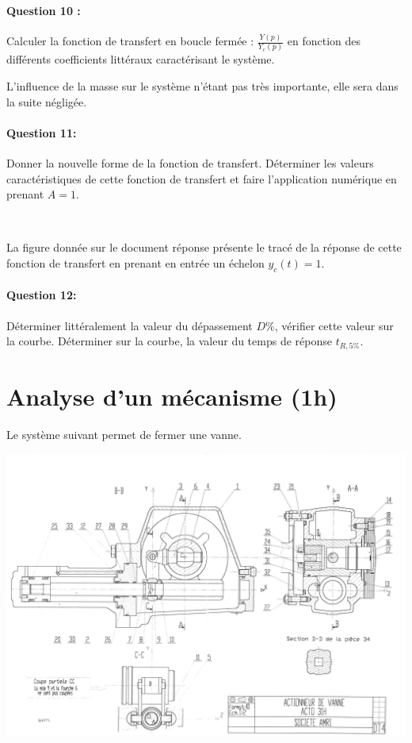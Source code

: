 \paragraph{Question 10 :} Calculer la fonction de transfert en boucle fermée : $\frac{Y(p)}{Y_c(p)}$ en fonction des différents coefficients littéraux caractérisant le système.

L'influence de la masse sur le système n'étant pas très importante, elle sera dans la suite négligée.

\paragraph{Question 11:} Donner la nouvelle forme de la fonction de transfert. Déterminer les valeurs caractéristiques de cette fonction de transfert et faire l'application numérique en prenant $A=1$.

~\

La figure donnée sur le document réponse présente le tracé de la réponse de cette fonction de transfert en prenant en entrée un échelon $y_c(t)=1$.

\paragraph{Question 12:} Déterminer littéralement la valeur du dépassement $D\%$, vérifier cette valeur sur la courbe. Déterminer sur la courbe, la valeur du temps de réponse $t_{R,5\%}$.

\section{Analyse d'un mécanisme (1h)}

Le système suivant permet de fermer une vanne.

\begin{center}
 \includegraphics[width=0.8\linewidth]{img/Actionneur_vanne}
\end{center}

